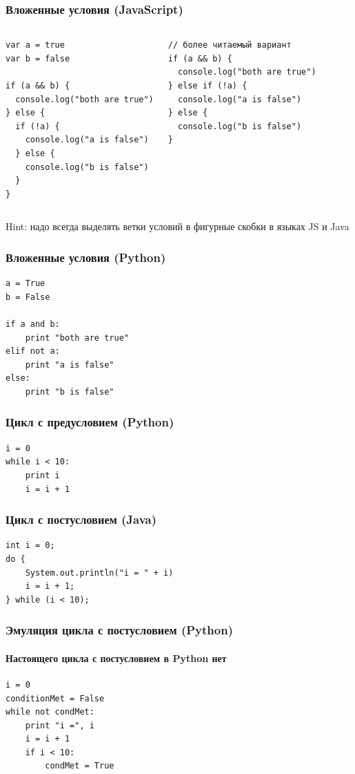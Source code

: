 {\begin{frame}[fragile]
\frametitle{Вложенные условия (JavaScript)}
\begin{columns}
    \begin{verbatim}
var a = true
var b = false

if (a && b) {
  console.log("both are true")
} else {
  if (!a) {
    console.log("a is false")
  } else {
    console.log("b is false")
  }
}
    \end{verbatim}
    \begin{verbatim}
// более читаемый вариант
if (a && b) {
  console.log("both are true")
} else if (!a) {
  console.log("a is false")
} else {
  console.log("b is false")
}
    \end{verbatim}
  \end{columns}
  Hint: надо всегда выделять ветки условий в фигурные скобки в языках JS и Java
\end{frame}

\begin{frame}[fragile]
\frametitle{Вложенные условия (Python)}
  \begin{verbatim}
a = True
b = False

if a and b:
    print "both are true"
elif not a:
    print "a is false"
else:
    print "b is false"
  \end{verbatim}
\end{frame}

\begin{frame}[fragile]
\frametitle{Цикл с предусловием (Python)}
  \begin{verbatim}
i = 0
while i < 10:
    print i
    i = i + 1
  \end{verbatim}
\end{frame}

\begin{frame}[fragile]
  \frametitle{Цикл с постусловием (Java)}
  \begin{verbatim}
int i = 0;
do {
    System.out.println("i = " + i)
    i = i + 1;
} while (i < 10);
  \end{verbatim}
\end{frame}


\begin{frame}[fragile]
  \frametitle{Эмуляция цикла с постусловием (Python)}
  \framesubtitle{Настоящего цикла с постусловием в Python нет}
  \begin{verbatim}
i = 0
conditionMet = False
while not condMet:
    print "i =", i
    i = i + 1
    if i < 10:
        condMet = True
  \end{verbatim}
\end{frame}

}
